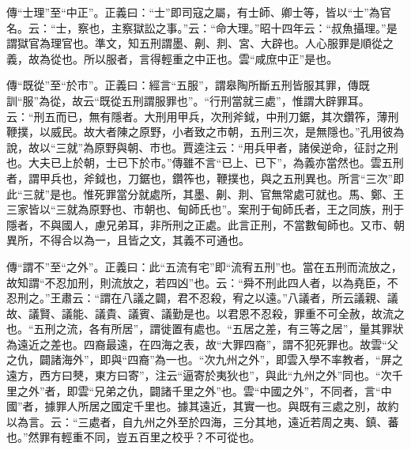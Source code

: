 {\noindent\zhuan{}\fzbyks 傳“士理”至“中正”。正義曰：“士”即司寇之屬，有士師、卿士等，皆以“士”為官名。云：“士，察也，主察獄訟之事。”云：“命大理。”昭十四年云：“叔魚攝理。”是謂獄官為理官也。準文，知五刑謂墨、劓、剕、宮、大辟也。人心服罪是順從之義，故為從也。所以服者，言得輕重之中正也。雲“咸庶中正”是也。 \par}

{\noindent\zhuan{}\fzbyks 傳“既從”至“於市”。正義曰：經言“五服”，謂皋陶所斷五刑皆服其罪，傳既訓“服”為從，故云“既從五刑謂服罪也”。“行刑當就三處”，惟謂大辟罪耳。云：“刑五而已，無有隱者。大刑用甲兵，次刑斧鉞，中刑刀鋸，其次鑽筰，薄刑鞭撲，以威民。故大者陳之原野，小者致之市朝，五刑三次，是無隱也。”孔用彼為說，故以“三就”為原野與朝、市也。賈逵注云：“用兵甲者，諸侯逆命，征討之刑也。大夫已上於朝，士已下於市。”傳雖不言“已上、已下”，為義亦當然也。雲五刑者，謂甲兵也，斧鉞也，刀鋸也，鑽筰也，鞭撲也，與之五刑異也。所言“三次”即此“三就”是也。惟死罪當分就處所，其墨、劓、剕、官無常處可就也。馬、鄭、王三家皆以“三就為原野也、市朝也、甸師氏也”。案刑于甸師氏者，王之同族，刑于隱者，不與國人，慮兄弟耳，非所刑之正處。此言正刑，不當數甸師也。又市、朝異所，不得合以為一，且皆之文，其義不可通也。 \par}

{\noindent\zhuan{}\fzbyks 傳“謂不”至“之外”。正義曰：此“五流有宅”即“流宥五刑”也。當在五刑而流放之，故知謂“不忍加刑，則流放之，若四凶”也。云：“舜不刑此四人者，以為堯臣，不忍刑之。”王肅云：“謂在八議之闢，君不忍殺，宥之以遠。”八議者，所云議親、議故、議賢、議能、議貴、議賓、議勤是也。以君恩不忍殺，罪重不可全赦，故流之也。“五刑之流，各有所居”，謂徙置有處也。“五居之差，有三等之居”，量其罪狀為遠近之差也。四裔最遠，在四海之表，故“大罪四裔”，謂不犯死罪也。故雲“父之仇，闢諸海外”，即與“四裔”為一也。“次九州之外”，即雲入學不率教者，“屏之遠方，西方曰僰，東方曰寄”，注云“逼寄於夷狄也”，與此“九州之外”同也。“次千里之外”者，即雲“兄弟之仇，闢諸千里之外”也。雲“中國之外”，不同者，言“中國”者，據罪人所居之國定千里也。據其遠近，其實一也。與既有三處之別，故約以為言。云：“三處者，自九州之外至於四海，三分其地，遠近若周之夷、鎮、蕃也。”然罪有輕重不同，豈五百里之校乎？不可從也。 \par}

